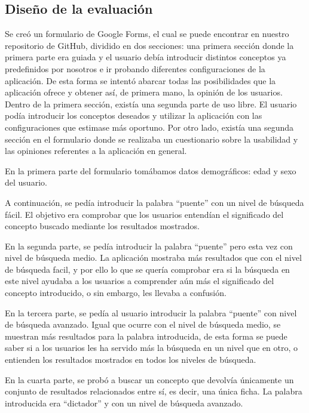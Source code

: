 \subsection{Diseño de la evaluación}
\label{cap:subsec:disenioEvaluacion}
Se creó un formulario de Google Forms, el cual se puede encontrar en nuestro repositorio de GitHub, dividido en dos secciones: una primera sección donde la primera parte era guiada y el usuario debía introducir distintos conceptos ya predefinidos por nosotros e ir probando diferentes configuraciones de la aplicación. De esta forma se intentó abarcar todas las posibilidades que la aplicación ofrece y obtener así, de primera mano, la opinión de los usuarios. Dentro de la primera sección, existía una segunda parte de uso libre. El usuario podía introducir los conceptos deseados y utilizar la aplicación con las configuraciones que estimase más oportuno. Por otro lado, existía una segunda sección en el formulario donde se realizaba un cuestionario sobre la usabilidad y las opiniones referentes a la aplicación en general.

En la primera parte del formulario tomábamos datos demográficos: edad y sexo del usuario.

A continuación, se pedía introducir la palabra ``puente'' con un nivel de búsqueda fácil.  El objetivo era comprobar que los usuarios entendían el significado del concepto buscado mediante los resultados mostrados.

En la segunda parte, se pedía introducir la palabra ``puente'' pero esta vez con nivel de búsqueda medio. La aplicación mostraba más resultados que con el nivel de búsqueda facil, y por ello lo que se quería comprobar era si la búsqueda en este nivel ayudaba a los usuarios a comprender aún más el significado del concepto introducido, o sin embargo, les llevaba a confusión.

En la tercera parte, se pedía al usuario introducir la palabra ``puente'' con nivel de búsqueda avanzado. Igual que ocurre con el nivel de búsqueda medio, se muestran más resultados para la palabra introducida, de esta forma se puede saber si a los usuarios les ha servido más la búsqueda en un nivel que en otro, o entienden los resultados mostrados en todos los niveles de búsqueda.

En la cuarta parte, se probó a buscar un concepto que devolvía únicamente un conjunto de resultados relacionados entre sí, es decir, una única ficha. La palabra introducida era ``dictador'' y con un nivel de búsqueda avanzado. 

